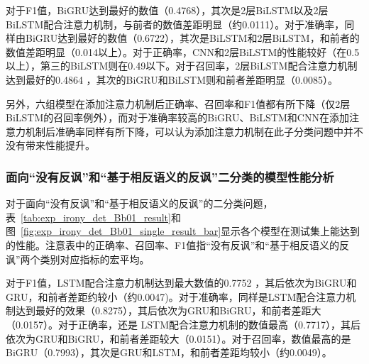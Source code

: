 对于F1值，BiGRU达到最好的数值（0.4768），其次是2层BiLSTM以及2层BiLSTM配合注意力机制，与前者的数值差距明显（约0.0111）。对于准确率，同样由BiGRU达到最好的数值（0.6722），其次是BiLSTM和2层BiLSTM，和前者的数值差距明显（0.014以上）。对于正确率，CNN和2层BiLSTM的性能较好（在0.5以上），第三的BiLSTM则在0.49以下。对于召回率，2层BiLSTM配合注意力机制达到最好的0.4864 ，其次的BiGRU和BiLSTM则和前者差距明显（0.0085）。

另外，六组模型在添加注意力机制后正确率、召回率和F1值都有所下降（仅2层BiLSTM的召回率例外），而对于准确率较高的BiGRU、BiLSTM和CNN在添加注意力机制后准确率同样有所下降，可以认为添加注意力机制在此子分类问题中并不没有带来性能提升。


\subsubsection{面向“没有反讽”和“基于相反语义的反讽”二分类的模型性能分析}
\label{sssec:exp_irony_det_Bb01_base}

对于面向“没有反讽”和“基于相反语义的反讽”的二分类问题，表~\ref{tab:exp_irony_det_Bb01_result}和图~\ref{fig:exp_irony_det_Bb01_single_result_bar}显示各个模型在测试集上能达到的性能。注意表中的正确率、召回率、F1值指“没有反讽”和“基于相反语义的反讽”两个类别对应指标的宏平均。

对于F1值，LSTM配合注意力机制达到最大数值的0.7752 ，其后依次为BiGRU和GRU，和前者差距约较小（约0.0047)。对于准确率，同样是LSTM配合注意力机制达到最好的效果（0.8275），其后依次为GRU和BiGRU，和前者差距大（0.0157）。对于正确率，还是 LSTM配合注意力机制的数值最高（0.7717），其后依次为GRU和BiGRU，和前者差距较大（0.0151）。对于召回率，数值最高的是BiGRU（0.7993），其次是GRU和LSTM，和前者差距均较小（约0.0049）。

